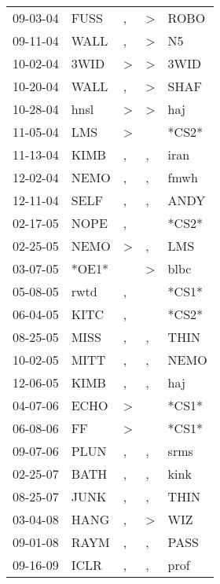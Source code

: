 \begin{supertabular}{lllll}
 09-03-04 &   FUSS &             , &     \textgreater &   ROBO \\
 09-11-04 &   WALL &             , &     \textgreater &     N5 \\
 10-02-04 &   3WID &  \textgreater &     \textgreater &   3WID \\
 10-20-04 &   WALL &             , &     \textgreater &   SHAF \\
 10-28-04 &   hnsl &  \textgreater &     \textgreater &    haj \\
 11-05-04 &    LMS &  \textgreater &                  &  *CS2* \\
 11-13-04 &   KIMB &             , &                , &   iran \\
 12-02-04 &   NEMO &             , &                , &   fmwh \\
 12-11-04 &   SELF &             , &                , &   ANDY \\
 02-17-05 &   NOPE &             , &                  &  *CS2* \\
 02-25-05 &   NEMO &  \textgreater &                , &    LMS \\
 03-07-05 &  *OE1* &               &     \textgreater &   blbc \\
 05-08-05 &   rwtd &             , &                  &  *CS1* \\
 06-04-05 &   KITC &             , &                  &  *CS2* \\
 08-25-05 &   MISS &             , &                , &   THIN \\
 10-02-05 &   MITT &             , &                , &   NEMO \\
 12-06-05 &   KIMB &             , &                , &    haj \\
 04-07-06 &   ECHO &  \textgreater &                  &  *CS1* \\
 06-08-06 &     FF &  \textgreater &                  &  *CS1* \\
 09-07-06 &   PLUN &             , &                , &   srms \\
 02-25-07 &   BATH &             , &                , &   kink \\
 08-25-07 &   JUNK &             , &                , &   THIN \\
 03-04-08 &   HANG &             , &     \textgreater &    WIZ \\
 09-01-08 &   RAYM &             , &                , &   PASS \\
 09-16-09 &   ICLR &             , &                , &   prof \\

\end{supertabular}
